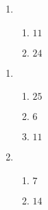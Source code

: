 \documentclass[12pt,twoside]{article}
\makeatletter
\def\emptycleardoublepage{\clearpage\if@twoside \ifodd\c@page\else
\thispagestyle{empty}%
\hbox{}\newpage\if@twocolumn\hbox{}\newpage\fi\fi\fi}
\makeatother
\begin{document}
\begin{multicols}{2}
\begin{enumerate}
\item \begin{enumerate}
\def \a{5}\def \b{6}\def \ab{11}
\item $\ab$
\def \a{7}\def \b{17}\def \apb{24}
\item $\apb$
\def \vshift{1}\def \hshift{-4}\def \chang{-2}\def \findval{-6}\def \yval{5}
\end{enumerate}
\end{enumerate}\end{multicols}\emptycleardoublepage{}\graphicspath{{/Users/jilan/Downloads/Randomizer/Randomizer/Sample Course/Sample Assessment 2/}}\begin{multicols}{2} \begin{enumerate}
\item \begin{enumerate}
\def \a{8}\def \b{17}\def \apb{25}
\item $\apb$
\def \a{11}\def \dif{6}\def \b{5}
\item $\dif$
\def \a{5}\def \b{6}\def \ab{11}
\item $\ab$
\def \vshift{1}\def \hshift{0}\def \chang{-2}\def \findval{-2}\def \yval{5}
\end{enumerate}

\item \begin{enumerate}
\def \a{10}\def \dif{7}\def \b{3}
\item $\dif$
\def \a{5}\def \b{9}\def \ab{14}
\item $\ab$
\def \vshift{1}\def \hshift{4}\def \chang{2}\def \findval{6}\def \yval{-3}
\end{enumerate}
\end{enumerate}\end{multicols}\emptycleardoublepage 
\end{document}
